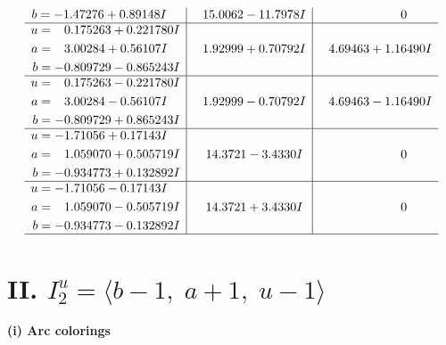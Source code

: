 \documentclass[1p]{elsarticle_modified}
\theoremstyle{definition}
\begin{document}
$$\begin{array}{c|c|c}
\begin{aligned}
b &= -1.47276 + 0.89148 I\end{aligned}
 & \phantom{-}15.0062 - 11.7978 I & \phantom{-0.000000 } 0 \\ \hline\begin{aligned}
u &= \phantom{-}0.175263 + 0.221780 I \\
a &= \phantom{-}3.00284 + 0.56107 I \\
b &= -0.809729 - 0.865243 I\end{aligned}
 & \phantom{-}1.92999 + 0.70792 I & \phantom{-}4.69463 + 1.16490 I \\ \hline\begin{aligned}
u &= \phantom{-}0.175263 - 0.221780 I \\
a &= \phantom{-}3.00284 - 0.56107 I \\
b &= -0.809729 + 0.865243 I\end{aligned}
 & \phantom{-}1.92999 - 0.70792 I & \phantom{-}4.69463 - 1.16490 I \\ \hline\begin{aligned}
u &= -1.71056 + 0.17143 I \\
a &= \phantom{-}1.059070 + 0.505719 I \\
b &= -0.934773 + 0.132892 I\end{aligned}
 & \phantom{-}14.3721 - 3.4330 I & \phantom{-0.000000 } 0 \\ \hline\begin{aligned}
u &= -1.71056 - 0.17143 I \\
a &= \phantom{-}1.059070 - 0.505719 I \\
b &= -0.934773 - 0.132892 I\end{aligned}
 & \phantom{-}14.3721 + 3.4330 I & \phantom{-0.000000 } 0\\
 \hline 
 \end{array}$$\newpage\newpage\renewcommand{\arraystretch}{1}
\centering \section*{II. $I^u_{2}= \langle b-1,\;a+1,\;u-1 \rangle$}
\flushleft \textbf{(i) Arc colorings}\\
\end{document}
